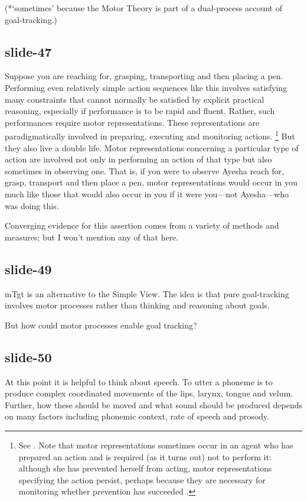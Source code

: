 \documentclass[12pt,\papersize]{extarticle}
\begin{document}
(*‘sometimes’ because the Motor Theory is part of a dual-process account of goal-tracking.)
 
\subsection{slide-47}
Suppose you are reaching for, grasping, transporting and then placing a pen. Performing even
relatively simple action sequences like this involves satisfying many constraints that cannot
normally be satisfied by explicit practical reasoning, especially if performance is to be rapid and
fluent. Rather, such performances require motor representations.
These representations are paradigmatically involved in preparing, executing and monitoring actions.%
\footnote{%
See \citet{wolpert:1995internal, miall:1996_forward, jeannerod:1998nbo, zhang:2007_planning}.
Note that motor representations sometimes occur in an agent who has prepared an action and is required (as it turns out) not to perform it: although she has prevented herself from acting, motor representations specifying the action persist, perhaps because they are necessary for monitoring whether prevention has succeeded \citep{bonini:2014_ventral}.
}
But they also live a double life. Motor representations concerning a particular type of action are
involved not only in performing an action of that type but also sometimes in observing one. That is,
if you were to observe Ayesha reach for, grasp, transport and then place a pen, motor representations
would occur in you much like those that would also occur in you if it were you---not Ayesha---who was
doing this.
 
Converging evidence for this assertion comes from a variety of methods and measures;
but I won’t mention any of that here.
 
\subsection{slide-49}
mTgt is an alternative to the Simple View.
The idea is that pure goal-tracking involves motor processes rather than thinking
and reasoning about goals.
 
But how could motor processes enable goal tracking?
 
\subsection{slide-50}
At this point it is helpful to think about speech.
To utter a phoneme is to produce complex coordinated movements of the 
lips, larynx, tongue and velum.
Further, how these should be moved and what sound should be produced depends on
many factors including phonemic context, rate of speech and prosody.
 
\end{document}
